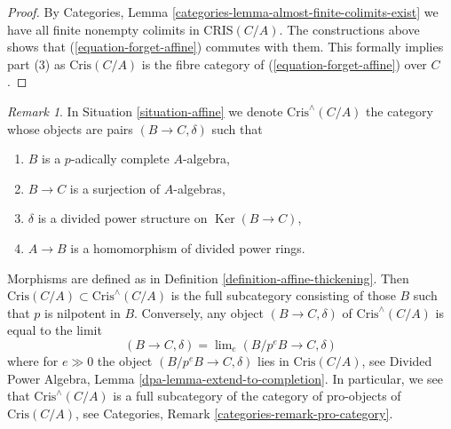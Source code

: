 \documentclass{stacks-project}
\theoremstyle{plain}
\theoremstyle{definition}
\theoremstyle{remark}
\newtheorem{remark}[subsection]{Remark}
\numberwithin{equation}{subsection}
\def\lim{\mathop{\mathrm{lim}}\nolimits}
\def\Ker{\mathop{\mathrm{Ker}}}
\begin{document}
\begin{proof}
\medskip\noindent
By Categories, Lemma \ref{categories-lemma-almost-finite-colimits-exist}
we have all finite nonempty colimits in $\text{CRIS}(C/A)$. The constructions
above shows that (\ref{equation-forget-affine}) commutes with them.
This formally implies part (3) as $\text{Cris}(C/A)$ is the fibre category
of (\ref{equation-forget-affine}) over $C$.
\end{proof}

\begin{remark}
\label{remark-completed-affine-site}
In Situation \ref{situation-affine} we denote
$\text{Cris}^\wedge(C/A)$ the category whose objects are
pairs $(B \to C, \delta)$ such that
\begin{enumerate}
\item $B$ is a $p$-adically complete $A$-algebra,
\item $B \to C$ is a surjection of $A$-algebras,
\item $\delta$ is a divided power structure on $\Ker(B \to C)$,
\item $A \to B$ is a homomorphism of divided power rings.
\end{enumerate}
Morphisms are defined as in Definition \ref{definition-affine-thickening}.
Then $\text{Cris}(C/A) \subset \text{Cris}^\wedge(C/A)$ is the full
subcategory consisting of those $B$ such that $p$ is nilpotent in $B$.
Conversely, any object $(B \to C, \delta)$ of $\text{Cris}^\wedge(C/A)$
is equal to the limit
$$
(B \to C, \delta) = \lim_e (B/p^eB \to C, \delta)
$$
where for $e \gg 0$ the object $(B/p^eB \to C, \delta)$ lies
in $\text{Cris}(C/A)$, see
Divided Power Algebra, Lemma \ref{dpa-lemma-extend-to-completion}.
In particular, we see that $\text{Cris}^\wedge(C/A)$ is a full subcategory
of the category of pro-objects of $\text{Cris}(C/A)$, see
Categories, Remark \ref{categories-remark-pro-category}.
\end{remark}
\end{document}
